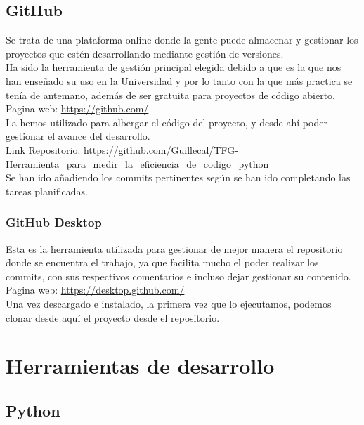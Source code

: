 \subsection{GitHub}

Se trata de una plataforma online donde la gente puede almacenar y gestionar los proyectos que estén desarrollando mediante gestión de versiones.\\

Ha sido la herramienta de gestión principal elegida debido a que es la que nos han enseñado su uso en la Universidad y por lo tanto con la que más practica se tenía de antemano, además de ser gratuita para proyectos de código abierto.\\

Pagina web: \url{https://github.com/} \\

La hemos utilizado para albergar el código del proyecto, y desde ahí poder gestionar el avance del desarrollo.\\

Link Repositorio: \url{https://github.com/Guillecal/TFG-Herramienta_para_medir_la_eficiencia_de_codigo_python} \\

Se han ido añadiendo los commits pertinentes según se han ido completando las tareas planificadas.

\subsubsection{GitHub Desktop}

Esta es la herramienta utilizada para gestionar de mejor manera el repositorio donde se encuentra el trabajo, ya que facilita mucho el poder realizar los commits, con sus respectivos comentarios e incluso dejar gestionar su contenido.\\

Pagina web: \url{https://desktop.github.com/} \\

Una vez descargado e instalado, la primera vez que lo ejecutamos, podemos clonar desde aquí el proyecto desde el repositorio.


\section{Herramientas de desarrollo}

\subsection{Python}

